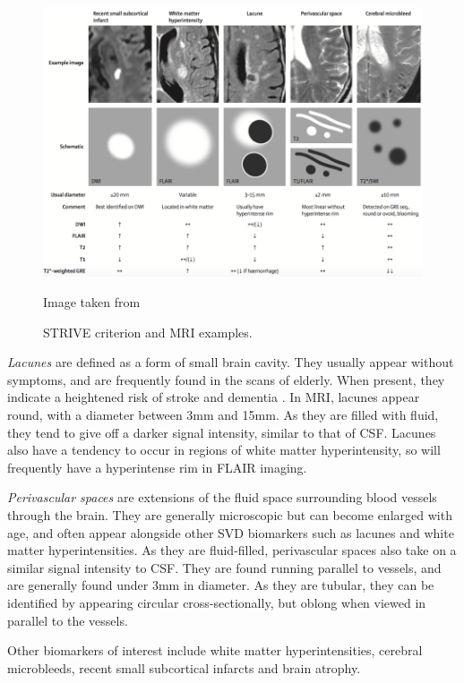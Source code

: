 \begin{figure}[ht]
	\centering
	\includegraphics[width = \textwidth]{Images/2_STRIVE.png}
	\caption{STRIVE criterion and MRI examples.}
	\small Image taken from \cite{WardlawJ.M.2013Nsfr}
\end{figure}

\textit{Lacunes} are defined as a form of small brain cavity. They usually appear without symptoms, and are frequently found in the scans of elderly. When present, they indicate a heightened risk of stroke and dementia \cite{VanDerFlierM.Wiesje2005SVDa, BenjaminJ.Philip2018LIbN}. In MRI, lacunes appear round, with a diameter between 3mm and 15mm. As they are filled with fluid, they tend to give off a darker signal intensity, similar to that of CSF. Lacunes also have a tendency to occur in regions of white matter hyperintensity, so will frequently have a hyperintense rim in FLAIR imaging.

\textit{Perivascular spaces} are extensions of the fluid space surrounding blood vessels through the brain. They are generally microscopic but can become enlarged with age, and often appear alongside other SVD biomarkers such as lacunes and white matter hyperintensities. As they are fluid-filled, perivascular spaces also take on a similar signal intensity to CSF. They are found running parallel to vessels, and are generally found under 3mm in diameter. As they are tubular, they can be identified by appearing circular cross-sectionally, but oblong when viewed in parallel to the vessels.

Other biomarkers of interest include white matter hyperintensities, cerebral microbleeds, recent small subcortical infarcts and brain atrophy. 

